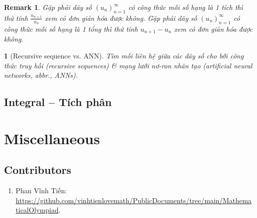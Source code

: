 \documentclass{article}
\newtheorem{baitoan}{}
\newtheorem{remark}{Remark}
\begin{document}
\begin{remark}
	Gặp phải dãy số $(u_n)_{n=1}^\infty$ có công thức mỗi số hạng là 1 tích thì thử tính $\frac{u_{n+1}}{u_n}$ xem có đơn giản hóa được không. Gặp phải dãy số $(u_n)_{n=1}^\infty$ có công thức mỗi số hạng là 1 tổng thì thử tính $u_{n+1} - u_n$ xem có đơn giản hóa được không.
\end{remark}

\begin{baitoan}[Recursive sequence vs. ANN]
	Tìm mối liên hệ giữa các dãy số cho bởi công thức truy hồi (recursive sequences) \& mạng lưới nơ-ron nhân tạo (artificial neural networks, abbr., ANNs).
\end{baitoan}


\subsection{Integral -- Tích phân}


\section{Miscellaneous}

\subsection{Contributors}

\begin{enumerate}
	\item {\sc Phan Vĩnh Tiến}: \url{https://github.com/vinhtienlovemath/PublicDocuments/tree/main/MathematicalOlympiad}.
\end{enumerate}


\printbibliography[heading=bibintoc]
	
\end{document}
